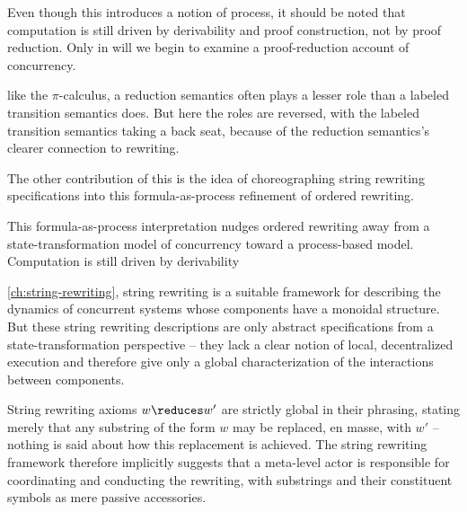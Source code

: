 

Even though this  introduces a notion of process, it should be noted that computation is still driven by derivability and proof construction, not by proof reduction.
Only in  will we begin to examine a proof-reduction account of concurrency.


 like the $\pi$-calculus, a reduction semantics often plays a lesser role than a labeled transition semantics does.
But here the roles are reversed, with the labeled transition semantics taking a back seat, because of the reduction semantics's clearer connection to rewriting.

The other contribution of this  is the idea of choreographing string rewriting specifications into this formula-as-process refinement of ordered rewriting.

This formula-as-process interpretation nudges ordered rewriting away from a state-transformation model of concurrency toward a process-based model.
Computation is still driven by derivability



 \cref{ch:string-rewriting}, string rewriting is a suitable framework for describing the dynamics of concurrent systems whose components have a monoidal structure.
But these string rewriting descriptions are only abstract specifications from a state-transformation perspective -- they lack a clear notion of local, decentralized execution and therefore give only a global characterization of the interactions between components.

String rewriting axioms $w \reduces w'$ are strictly global in their phrasing, stating merely that any substring of the form $w$ may be replaced, en masse, with $w'$ -- nothing is said about how this replacement is achieved.
The string rewriting framework therefore implicitly suggests that a meta-level actor is responsible for coordinating and conducting the rewriting, with substrings and their constituent symbols as mere passive accessories.

